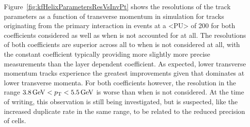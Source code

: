 Figure~\ref{fig:kfHelixParametersResVsInvPt} shows the resolutions of the track parameters as a function of transverse momentum in simulation for tracks originating from the primary interaction in \ttbar events at a <PU> of 200 for both \MS coefficients considered as well as when \MS is not accounted for at all.
The resolutions of both \MS coefficients are superior across all \pt to when \MS is not considered at all, with the constant \MS coefficient typically providing more slightly more precise measurements than the layer dependent coefficient.  
As expected, lower transverse momentum tracks experience the greatest improvements given that \MS dominates at lower transverse momenta.
For both coefficients however, the \pt resolution in the range $ 3.8 \,\text{Ge\hspace{-.08em}V} < p_{\mathrm{T}} < 5.5\,\text{Ge\hspace{-.08em}V}$ is worse than when \MS is not considered.
At the time of writing, this observation is still being investigated, but is suspected, like the increased duplicate rate in the same \pT range, to be related to the reduced precision of \HT cells.

